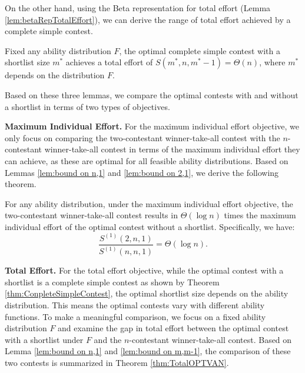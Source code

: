 On the other hand, using the Beta representation for total effort (Lemma \ref{lem:betaRepTotalEffort}), we can derive the range of total effort achieved by a complete simple contest. 

\begin{lemma}\label{lem:bound on m,m-1}
    Fixed any ability distribution $F$, the optimal complete simple contest with a shortlist size $m^*$ achieves a total effort of $S(m^*,n, m^*-1) = \Theta(n)$, where $m^*$ depends on the distribution $F$.
\end{lemma}

Based on these three lemmas, we compare the optimal contests with and without a shortlist in terms of two types of objectives.

\noindent \textbf{Maximum Individual Effort.}
For the maximum individual effort objective, we only focus on comparing the two-contestant winner-take-all contest with the $n$-contestant winner-take-all contest in terms of the maximum individual effort they can achieve, as these are optimal for all feasible ability distributions. Based on Lemmas \ref{lem:bound on n,1} and \ref{lem:bound on 2,1}, we derive the following theorem.

\begin{theorem}\label{thm: 2,1 vs n,1 max effort}
    For any ability distribution, under the maximum individual effort objective, the two-contestant winner-take-all contest results in $\Theta(\log n)$ times the maximum individual effort of the optimal contest without a shortlist. Specifically, we have:
    $$\frac{S^{(1)}(2,n,1)}{S^{(1)}(n,n,1)} = \Theta(\log n).$$
\end{theorem}

\noindent \textbf{Total Effort.}
For the total effort objective, while the optimal contest with a shortlist is a complete simple contest as shown by Theorem \ref{thm:ConpleteSimpleContest}, the optimal shortlist size depends on the ability distribution. This means the optimal contests vary with different ability functions. To make a meaningful comparison, we focus on a fixed ability distribution $F$ and examine the gap in total effort between the optimal contest with a shortlist under $F$ and the $n$-contestant winner-take-all contest. Based on Lemma \ref{lem:bound on n,1} and \ref{lem:bound on m,m-1}, the comparison of these two contests is summarized in Theorem \ref{thm:TotalOPTVAN}.

